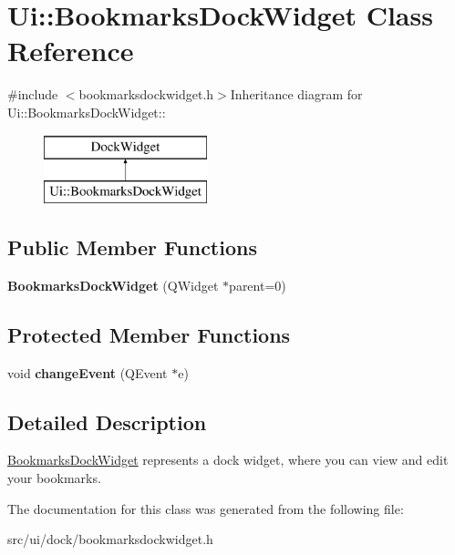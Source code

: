 \hypertarget{classUi_1_1BookmarksDockWidget}{
\section{Ui::BookmarksDockWidget Class Reference}
\label{classUi_1_1BookmarksDockWidget}
}


{\ttfamily \#include $<$bookmarksdockwidget.h$>$}Inheritance diagram for Ui::BookmarksDockWidget::\begin{figure}[H]
\begin{center}
\leavevmode
\includegraphics[height=2cm]{classUi_1_1BookmarksDockWidget}
\end{center}
\end{figure}
\subsection*{Public Member Functions}
\begin{DoxyCompactItemize}
\item 
\hypertarget{classUi_1_1BookmarksDockWidget_a153c616749848fc8829ae3af66796ed8}{
{\bfseries BookmarksDockWidget} (QWidget $\ast$parent=0)}
\label{classUi_1_1BookmarksDockWidget_a153c616749848fc8829ae3af66796ed8}

\end{DoxyCompactItemize}
\subsection*{Protected Member Functions}
\begin{DoxyCompactItemize}
\item 
\hypertarget{classUi_1_1BookmarksDockWidget_a9046520348712e8d913ac6af1f939e8c}{
void {\bfseries changeEvent} (QEvent $\ast$e)}
\label{classUi_1_1BookmarksDockWidget_a9046520348712e8d913ac6af1f939e8c}

\end{DoxyCompactItemize}


\subsection{Detailed Description}
\hyperlink{classUi_1_1BookmarksDockWidget}{BookmarksDockWidget} represents a dock widget, where you can view and edit your bookmarks. 

The documentation for this class was generated from the following file:\begin{DoxyCompactItemize}
\item 
src/ui/dock/bookmarksdockwidget.h\end{DoxyCompactItemize}
